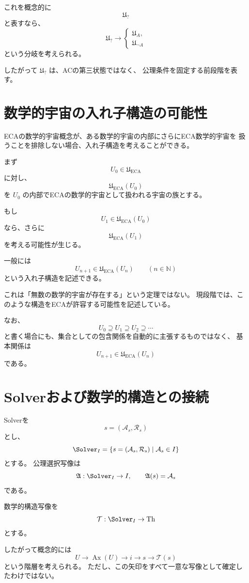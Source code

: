 \documentclass[11pt,a4paper]{article}
\begin{document}
これを概念的に
\[
\mathfrak{U}_{?}
\]
と表すなら、
\[
\boxed{
\mathfrak{U}_{?}
\longrightarrow
\begin{cases}
\mathfrak{U}_A,\\
\mathfrak{U}_{\neg A}
\end{cases}}
\]
という分岐を考えられる。

したがって \(\mathfrak{U}_?\) は、ACの第三状態ではなく、
公理条件を固定する前段階を表す。

\section{数学的宇宙の入れ子構造の可能性}
ECAの数学的宇宙概念が、ある数学的宇宙の内部にさらにECA数学的宇宙を
扱うことを排除しない場合、入れ子構造を考えることができる。

まず
\[
U_0\in\mathfrak{U}_{\mathrm{ECA}}
\]
に対し、
\[
\mathfrak{U}_{\mathrm{ECA}}(U_0)
\]
を \(U_0\) の内部でECAの数学的宇宙として扱われる宇宙の族とする。

もし
\[
U_1\in\mathfrak{U}_{\mathrm{ECA}}(U_0)
\]
なら、さらに
\[
\mathfrak{U}_{\mathrm{ECA}}(U_1)
\]
を考える可能性が生じる。

一般には
\[
\boxed{
U_{n+1}\in\mathfrak{U}_{\mathrm{ECA}}(U_n)
}
\qquad(n\in\mathbb N)
\]
という入れ子構造を記述できる。

これは「無数の数学的宇宙が存在する」という定理ではない。
現段階では、このような構造をECAが許容する可能性を記述している。

なお、
\[
U_0\supseteq U_1\supseteq U_2\supseteq\cdots
\]
と書く場合にも、集合としての包含関係を自動的に主張するものではなく、
基本関係は
\[
U_{n+1}\in\mathfrak{U}_{\mathrm{ECA}}(U_n)
\]
である。

\section{Solverおよび数学的構造との接続}
Solverを
\[
s=(\mathcal{A}_s,\mathcal{R}_s)
\]
とし、
\[
\Solver_I
=
\{s=(\mathcal{A}_s,\mathcal{R}_s)\mid\mathcal{A}_s\in I\}
\]
とする。
公理選択写像は
\[
\mathfrak{A}:\Solver_I\to I,
\qquad
\mathfrak{A}(s)=\mathcal{A}_s
\]
である。

数学的構造写像を
\[
\mathcal{T}:\Solver_I\to\mathrm{Th}
\]
とする。

したがって概念的には
\[
U
\longrightarrow
\operatorname{Ax}(U)
\longrightarrow
i
\longrightarrow
s
\longrightarrow
\mathcal{T}(s)
\]
という階層を考えられる。
ただし、この矢印をすべて一意な写像として確定したわけではない。
\end{document}
